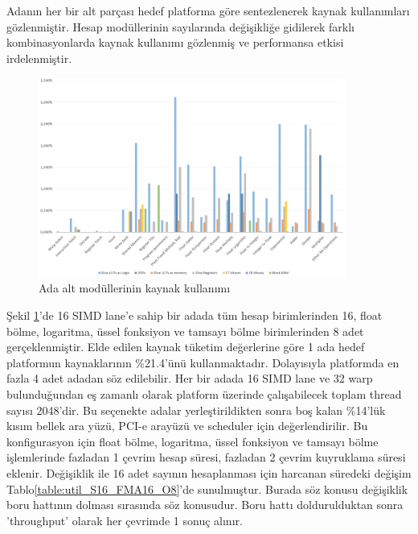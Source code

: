Adanın her bir alt parçası hedef platforma göre sentezlenerek kaynak kullanımları gözlenmiştir. Hesap modüllerinin sayılarında değişikliğe gidilerek farklı kombinasyonlarda kaynak kullanımı gözlenmiş ve performansa etkisi irdelenmiştir.\par
\begin{figure}[ht]
\centering
\shorthandoff{=}
\includegraphics[width=0.9\textwidth]{gorsel/Util_S16_FMA16_O8.png}
\shorthandoff{=}
\caption{Ada alt modüllerinin kaynak kullanımı}
\label{image:util_S16_FMA16_O8}
\end{figure}
Şekil \ref{image:util_S16_FMA16_O8}'de 16 SIMD lane'e sahip bir adada tüm hesap birimlerinden 16, float bölme, logaritma, üssel fonksiyon ve tamsayı bölme birimlerinden 8 adet gerçeklenmiştir. Elde edilen kaynak tüketim değerlerine göre 1 ada hedef platformun kaynaklarının \%21.4'ünü kullanmaktadır. Dolayısıyla platformda en fazla 4 adet adadan söz edilebilir. Her bir adada 16 SIMD lane ve 32 warp bulunduğundan eş zamanlı olarak platform üzerinde çalışabilecek toplam thread sayısı 2048'dir. Bu seçenekte adalar yerleştirildikten sonra boş kalan \%14'lük kısım bellek ara yüzü, PCI-e arayüzü ve scheduler için değerlendirilir. Bu konfigurasyon için float bölme, logaritma, üssel fonksiyon ve tamsayı bölme işlemlerinde fazladan 1 çevrim hesap süresi, fazladan 2 çevrim kuyruklama süresi eklenir. Değişiklik ile 16 adet sayının hesaplanması için harcanan süredeki değişim Tablo\ref{table:util_S16_FMA16_O8}'de sunulmuştur. Burada söz konusu değişiklik boru hattının dolması sırasında söz konusudur. Boru hattı doldurulduktan sonra 'throughput' olarak her çevrimde 1 sonuç alınır.\par 

